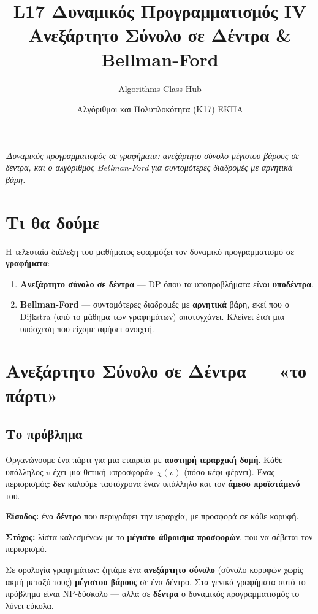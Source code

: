 \documentclass[11pt,a4paper]{article}
\title{\textbf{L17 \textperiodcentered{} Δυναμικός Προγραμματισμός IV}\\[2pt]
\large Ανεξάρτητο Σύνολο σε Δέντρα \& Bellman-Ford}
\author{Algorithms Class Hub}
\date{\small Αλγόριθμοι και Πολυπλοκότητα (K17) \textperiodcentered{} ΕΚΠΑ}
\begin{document}
\maketitle

\begin{center}\itshape\small
Δυναμικός προγραμματισμός σε γραφήματα: ανεξάρτητο σύνολο μέγιστου βάρους σε
δέντρα, και ο αλγόριθμος Bellman-Ford για συντομότερες διαδρομές με αρνητικά
βάρη.
\end{center}

\section{Τι θα δούμε}

Η τελευταία διάλεξη του μαθήματος εφαρμόζει τον δυναμικό προγραμματισμό σε
\textbf{γραφήματα}:
\begin{enumerate}
  \item \textbf{Ανεξάρτητο σύνολο σε δέντρα} --- DP όπου τα υποπροβλήματα είναι
  \textbf{υποδέντρα}.
  \item \textbf{Bellman-Ford} --- συντομότερες διαδρομές με \textbf{αρνητικά}
  βάρη, εκεί που ο Dijkstra (από το μάθημα των γραφημάτων) αποτυγχάνει. Κλείνει
  έτσι μια υπόσχεση που είχαμε αφήσει ανοιχτή.
\end{enumerate}

\section{Ανεξάρτητο Σύνολο σε Δέντρα --- «το πάρτι»}

\subsection{Το πρόβλημα}

Οργανώνουμε ένα πάρτι για μια εταιρεία με \textbf{αυστηρή ιεραρχική δομή}. Κάθε
υπάλληλος $v$ έχει μια θετική «προσφορά» $\chi(v)$ (πόσο κέφι φέρνει). Ένας
περιορισμός: \textbf{δεν} καλούμε ταυτόχρονα έναν υπάλληλο και τον \textbf{άμεσο
προϊστάμενό} του.

\textbf{Είσοδος:} ένα \textbf{δέντρο} που περιγράφει την ιεραρχία, με προσφορά σε
κάθε κορυφή.

\textbf{Στόχος:} λίστα καλεσμένων με το \textbf{μέγιστο άθροισμα προσφορών}, που
να σέβεται τον περιορισμό.

\begin{intuition}
Σε ορολογία γραφημάτων: ζητάμε ένα \textbf{ανεξάρτητο σύνολο} (σύνολο κορυφών
χωρίς ακμή μεταξύ τους) \textbf{μέγιστου βάρους} σε ένα δέντρο. Στα γενικά
γραφήματα αυτό το πρόβλημα είναι NP-δύσκολο --- αλλά σε \textbf{δέντρα} ο
δυναμικός προγραμματισμός το λύνει εύκολα.
\end{intuition}
\end{document}
